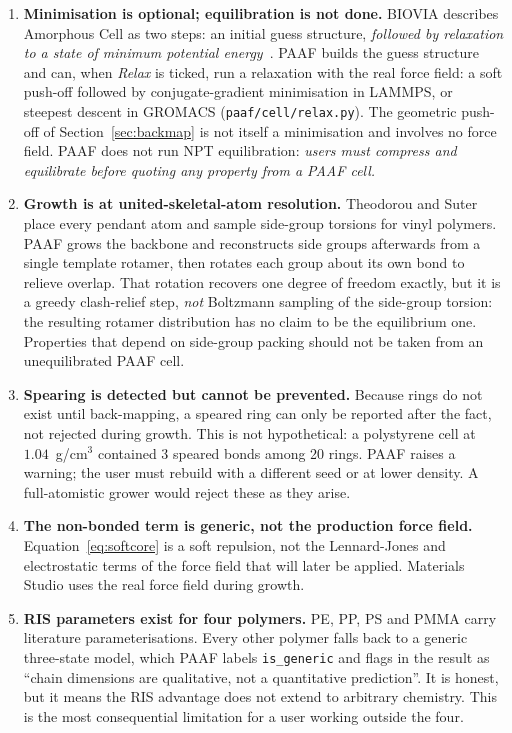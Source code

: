 \documentclass[11pt,a4paper]{article}
\begin{document}
\begin{enumerate}[label=\textbf{L\arabic*.}]

\item \textbf{Minimisation is optional; equilibration is not done.}
BIOVIA describes Amorphous Cell as two steps: an initial guess structure,
\emph{followed by relaxation to a state of minimum potential
energy}~\cite{biovia}. PAAF builds the guess structure and can, when
\emph{Relax} is ticked, run a relaxation with the real force field: a soft
push-off followed by conjugate-gradient minimisation in LAMMPS, or steepest
descent in GROMACS (\texttt{paaf/cell/relax.py}). The geometric push-off of
Section~\ref{sec:backmap} is not itself a minimisation and involves no force
field. PAAF does not run NPT equilibration: \emph{users must compress and
equilibrate before quoting any property from a PAAF cell.}

\item \textbf{Growth is at united-skeletal-atom resolution.}
Theodorou and Suter place every pendant atom and sample side-group torsions
for vinyl polymers. PAAF grows the backbone and reconstructs side groups
afterwards from a single template rotamer, then rotates each group about its
own bond to relieve overlap. That rotation recovers one degree of freedom
exactly, but it is a greedy clash-relief step, \emph{not} Boltzmann sampling
of the side-group torsion: the resulting rotamer distribution has no claim to
be the equilibrium one. Properties that depend on side-group packing should
not be taken from an unequilibrated PAAF cell.

\item \textbf{Spearing is detected but cannot be prevented.}
Because rings do not exist until back-mapping, a speared ring can only be
reported after the fact, not rejected during growth. This is not hypothetical:
a polystyrene cell at $1.04$~g/cm$^3$ contained 3 speared bonds among 20
rings. PAAF raises a warning; the user must rebuild with a different seed or
at lower density. A full-atomistic grower would reject these as they arise.

\item \textbf{The non-bonded term is generic, not the production force field.}
Equation~\eqref{eq:softcore} is a soft repulsion, not the Lennard-Jones and
electrostatic terms of the force field that will later be applied. Materials
Studio uses the real force field during growth.

\item \textbf{RIS parameters exist for four polymers.}
PE, PP, PS and PMMA carry literature parameterisations. Every other polymer
falls back to a generic three-state model, which PAAF labels
\texttt{is\_generic} and flags in the result as ``chain dimensions are
qualitative, not a quantitative prediction''. It is honest, but it means the
RIS advantage does not extend to arbitrary chemistry. This is the most
consequential limitation for a user working outside the four.


\end{enumerate}
\end{document}
